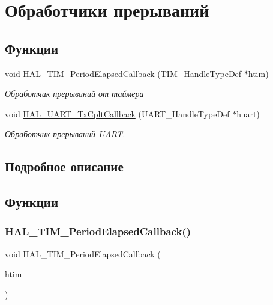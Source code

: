 \hypertarget{group___callback}{}\section{Обработчики прерываний}
\label{group___callback}
\subsection*{Функции}
\begin{DoxyCompactItemize}
\item 
void \hyperlink{group___callback_ga8a3b0ad512a6e6c6157440b68d395eac}{H\+A\+L\+\_\+\+T\+I\+M\+\_\+\+Period\+Elapsed\+Callback} (T\+I\+M\+\_\+\+Handle\+Type\+Def $\ast$htim)
\begin{DoxyCompactList}\small\item\em Обработчик прерываний от таймера \end{DoxyCompactList}\item 
void \hyperlink{group___callback_gabcdf9b59049eccbc87d54042f9235b1a}{H\+A\+L\+\_\+\+U\+A\+R\+T\+\_\+\+Tx\+Cplt\+Callback} (U\+A\+R\+T\+\_\+\+Handle\+Type\+Def $\ast$huart)
\begin{DoxyCompactList}\small\item\em Обработчик прерываний U\+A\+RT. \end{DoxyCompactList}\end{DoxyCompactItemize}


\subsection{Подробное описание}


\subsection{Функции}
\mbox{\label{group___callback_ga8a3b0ad512a6e6c6157440b68d395eac}} 
\subsubsection{\texorpdfstring{H\+A\+L\+\_\+\+T\+I\+M\+\_\+\+Period\+Elapsed\+Callback()}{HAL\_TIM\_PeriodElapsedCallback()}}
{\footnotesize\ttfamily void H\+A\+L\+\_\+\+T\+I\+M\+\_\+\+Period\+Elapsed\+Callback (\begin{DoxyParamCaption}\item[{T\+I\+M\+\_\+\+Handle\+Type\+Def $\ast$}]{htim }\end{DoxyParamCaption})}



